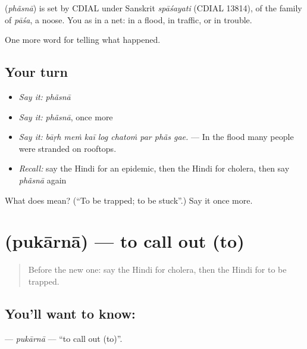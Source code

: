 \begin{cousinweb}
\textbf{} (\emph{phãsnā}) is set by CDIAL under Sanskrit \emph{spāśayati} (CDIAL 13814), of the family of \emph{pāśa}, a noose. You \textbf{ } as in a net: in a flood, in traffic, or in trouble.
\end{cousinweb}

\begin{grammarlens}[title={What you've built}]
One more word for telling what happened.
\end{grammarlens}

\subsection*{Your turn}
\begin{itemize}
\raggedright
  \item \emph{Say it:} \emph{phãsnā}
  \item \emph{Say it:} \emph{phãsnā}, once more
  \item \emph{Say it:} \emph{bāṛh meṁ kaī log chatoṁ par phãs gae.} — In the flood many people were stranded on rooftops.
  \item \emph{Recall:} say the Hindi for an epidemic, then the Hindi for cholera, then say \emph{phãsnā} again
\end{itemize}

\begin{tcolorbox}[breakable,colback=teal!4,colframe=teal!35!black,title={Before you move on}]
What does  mean? (\textquotedblleft{}To be trapped; to be stuck\textquotedblright{}.) Say it once more.
\end{tcolorbox}
\section[\texorpdfstring{\hi{पुकारना} (pukārnā)}{पुकारना (pukārnā)}]{ (pukārnā) — to call out (to)}

\label{lesson:HI-C307-pukarna}



\begin{quote}
Before the new one: say the Hindi for cholera, then the Hindi for to be trapped.
\end{quote}

\subsection*{You'll want to know: }
\textbf{} — \emph{pukārnā} — \textquotedblleft{}to call out (to)\textquotedblright{}.

